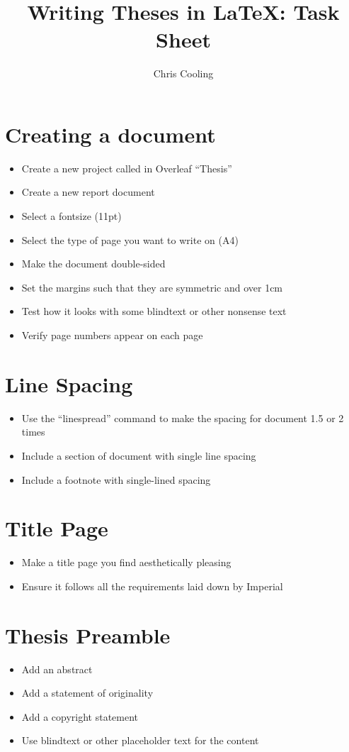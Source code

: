 \documentclass[11pt,a4paper]{article}
\begin{document}
\title{Writing Theses in \LaTeX: Task Sheet}
\author{Chris Cooling}
\maketitle
\pagestyle{empty}
\thispagestyle{empty}

\section{Creating a document}
\begin{itemize}
\item Create a new project called in Overleaf ``Thesis''
\item Create a new report document
\item Select a fontsize (11pt)
\item Select the type of page you want to write on (A4)
\item Make the document double-sided
\item Set the margins such that they are symmetric and over 1cm
\item Test how it looks with some blindtext or other nonsense text
\item Verify page numbers appear on each page
\end{itemize}

\section{Line Spacing}
\begin{itemize}
\item Use the ``linespread'' command to make the spacing for document 1.5 or 2 times
\item Include a section of document with single line spacing
\item Include a footnote with single-lined spacing
\end{itemize}

\section{Title Page}
\begin{itemize}
\item Make a title page you find aesthetically pleasing
\item Ensure it follows all the requirements laid down by Imperial
\end{itemize}

\section{Thesis Preamble}
\begin{itemize}
\item Add an abstract
\item Add a statement of originality
\item Add a copyright statement
\item Use blindtext or other placeholder text for the content
\end{itemize}
\end{document}
